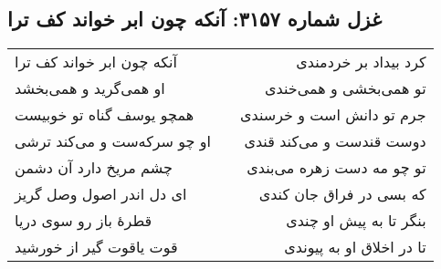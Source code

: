 \begin{center}
\section*{غزل شماره ۳۱۵۷: آنکه چون ابر خواند کف ترا}
\label{sec:3157}
\begin{longtable}{l p{0.5cm} r}
آنکه چون ابر خواند کف ترا
&&
کرد بیداد بر خردمندی
\\
او همی‌گرید و همی‌بخشد
&&
تو همی‌بخشی و همی‌خندی
\\
همچو یوسف گناه تو خوبیست
&&
جرم تو دانش است و خرسندی
\\
او چو سرکه‌ست و می‌کند ترشی
&&
دوست قندست و می‌کند قندی
\\
چشم مریخ دارد آن دشمن
&&
تو چو مه دست زهره می‌بندی
\\
ای دل اندر اصول وصل گریز
&&
که بسی در فراق جان کندی
\\
قطرهٔ باز رو سوی دریا
&&
بنگر تا به پیش او چندی
\\
قوت یاقوت گیر از خورشید
&&
تا در اخلاق او به پیوندی
\\
\end{longtable}
\end{center}
